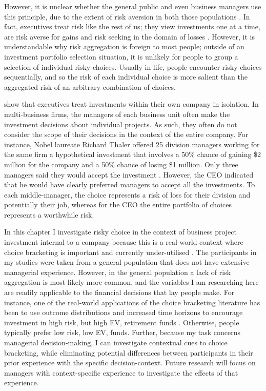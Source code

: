 \documentclass[a4paper, nobind, dvipsnames]{templates/ociamthesis}
\theoremstyle{definition}
\theoremstyle{definition}
\theoremstyle{definition}
\theoremstyle{definition}
\theoremstyle{remark}
\begin{document}
However, it is unclear whether the general public and even business managers use
this principle, due to the extent of risk aversion in both those populations
\autocites[e.g.,][]{tversky1992,march1987}. In fact, executives treat risk like the rest
of us; they view investments one at a time, are risk averse for gains and risk
seeking in the domain of losses \autocite{maccrimmon1986,swalm1966,lovallo2020}.
However, it is understandable why risk aggregation is foreign to most people;
outside of an investment portfolio selection situation, it is unlikely for
people to group a selection of individual risky choices. Usually in life, people
encounter risky choices sequentially, and so the risk of each individual choice
is more salient than the aggregated risk of an arbitrary combination of choices.

\textcite{lovallo2020} show that executives treat investments within their own company in
isolation. In multi-business firms, the managers of each business unit often
make the investment decisions about individual projects. As such, they often do
not consider the scope of their decisions in the context of the entire company.
For instance, Nobel laureate Richard Thaler offered 25 division managers working
for the same firm a hypothetical investment that involves a 50\% chance of
gaining \$2 million for the company and a 50\% chance of losing \$1 million. Only
three managers said they would accept the investment \autocite{thaler1999}. However, the
CEO indicated that he would have clearly preferred managers to accept all the
investments. To each middle-manager, the choice represents a risk of loss for
their division and potentially their job, whereas for the CEO the entire
portfolio of choices represents a worthwhile risk.

In this chapter I investigate risky choice in the context of business project
investment internal to a company because this is a real-world context where
choice bracketing is important and currently under-utilised \autocite{lovallo2020}. The
participants in my studies were taken from a general population that does not
have extensive managerial experience. However, in the general population a lack
of risk aggregation is most likely more common, and the variables I am
researching here are readily applicable to the financial decisions that lay
people make. For instance, one of the real-world applications of the choice
bracketing literature has been to use outcome distributions and increased time
horizons to encourage investment in high risk, but high EV, retirement funds
\autocite[e.g.,][]{benartzi1999}. Otherwise, people typically prefer low risk, low EV,
funds. Further, because my task concerns managerial decision-making, I can
investigate contextual cues to choice bracketing, while eliminating potential
differences between participants in their prior experience with the specific
decision-context. Future research will focus on managers with
context-specific experience to investigate the effects of that experience.
\end{document}
